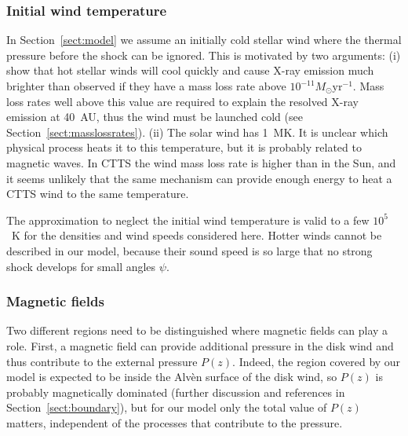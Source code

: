 \documentclass{emulateapj}
\begin{document}
\subsubsection{Initial wind temperature}
\label{sect:T_0}
In Section~\ref{sect:model} we assume an initially cold stellar wind where the thermal pressure before the shock can be ignored. This is motivated by two arguments: (i) \citet{2007IAUS..243..299M} show that hot stellar winds will cool quickly and cause X-ray emission much brighter than observed if they have a mass loss rate above $10^{-11}M_\odot\mathrm{ yr}^{-1}$.  Mass loss rates well above this value are required to explain the resolved X-ray emission at 40~AU, thus the wind must be launched cold (see Section~\ref{sect:masslossrates}). (ii) The solar wind has 1~MK. It is unclear which physical process heats it to this temperature, but it is probably related to magnetic waves. In CTTS the wind mass loss rate is higher than in the Sun, and it seems unlikely that the same mechanism can provide enough energy to heat a CTTS wind to the same temperature.

The approximation to neglect the initial wind temperature is valid to a few $10^5$~K for the densities and wind speeds considered here. Hotter winds cannot be described in our model, because their sound speed is so large that no strong shock develops for small angles $\psi$.

\subsubsection{Magnetic fields}
Two different regions need to be distinguished where magnetic fields can play a role. First, a magnetic field can provide additional pressure in the disk wind and thus contribute to the external pressure $P(z)$. Indeed, the region covered by our model is expected to be inside the Alv\`en surface of the disk wind, so $P(z)$ is probably magnetically dominated (further discussion and references in Section~\ref{sect:boundary}), but for our model only the total value of $P(z)$ matters, independent of the processes that contribute to the pressure. 
\end{document}
